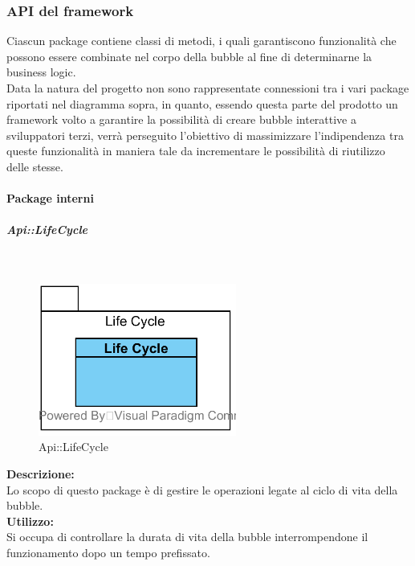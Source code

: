 \subsubsection{API del framework}
Ciascun package contiene classi di metodi, i quali garantiscono funzionalità che possono essere combinate nel corpo della bubble al fine di determinarne la business logic.\\
Data la natura del progetto non sono rappresentate connessioni tra i vari package riportati nel diagramma sopra, in quanto, essendo questa parte del prodotto un framework volto a garantire la possibilità di creare bubble interattive a sviluppatori terzi, verrà perseguito l'obiettivo di massimizzare l'indipendenza tra queste funzionalità in maniera tale da incrementare le possibilità di riutilizzo delle stesse.

\paragraph{Package interni}\mbox{}

\begin{samepage}
\subparagraph{Api\-::Life\-Cycle}\label{api-ciclovita}\mbox{}\\
\nopagebreak
\begin{figure}[H]
	\centering
	\includegraphics[height=5cm]{diagrammi_img/classi_e_package/api_vitabolla.png}
	\caption{Api\-::Life\-Cycle}
\end{figure}
\end{samepage}
\textbf{Descrizione:}\\ 
Lo scopo di questo package è di gestire le operazioni legate al ciclo di vita della bubble.\\
\textbf{Utilizzo:}\\
Si occupa di controllare la durata di vita della bubble interrompendone il funzionamento dopo un tempo prefissato.\\

